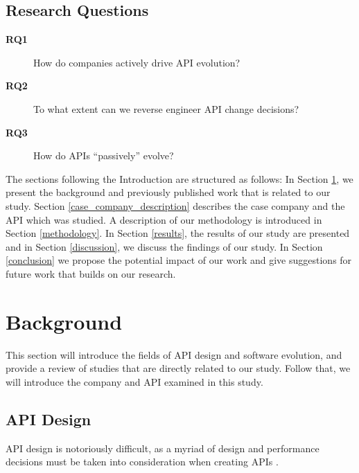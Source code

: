 \documentclass{sig-alternate}
\begin{document}


\subsection{Research Questions} \label{rqs}
\begin{description}
\item[\textbf{RQ1}] How do companies actively drive API evolution?
\item[\textbf{RQ2}] To what extent can we reverse engineer API change decisions?
\item[\textbf{RQ3}] How do APIs ``passively'' evolve?


\end{description}

The sections following the Introduction are structured as follows: In Section \ref{background}, we present the background and previously published work that is related to our study. Section \ref{case_company_description} describes the case company and the API which was studied. A description of our methodology is introduced in Section \ref{methodology}. In Section \ref{results}, the results of our study are presented and in Section \ref{discussion}, we discuss the findings of our study. In Section \ref{conclusion} we propose the potential impact of our work and give suggestions for future work that builds on our research. 

\section{Background} \label{background}
This section will introduce the fields of API design and software evolution, and provide a review of studies that are directly related to our study. Follow that, we will introduce the company and API examined in this study. 


\subsection{API Design} \label{api_design}
API design is notoriously difficult, as a myriad of design and performance decisions must be taken into consideration when creating APIs \cite{afonso2012evaluating, bloch2008effective, stylos2006comparing}.
\end{document}
